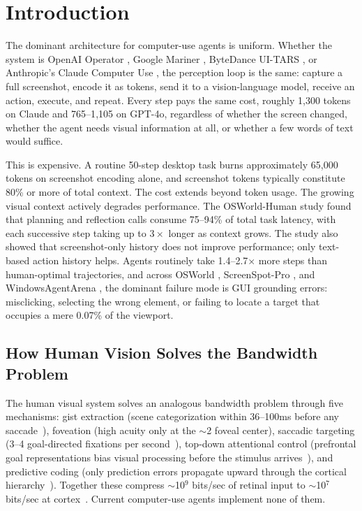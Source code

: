 \documentclass[11pt,a4paper]{article}
\begin{document}
\section{Introduction}
\label{sec:introduction}

The dominant architecture for computer-use agents is uniform.
Whether the system is OpenAI Operator \cite{openai-operator}, Google Mariner \cite{google-mariner}, ByteDance UI-TARS \cite{ui-tars,ui-tars-2}, or Anthropic's Claude Computer Use \cite{claude-computer-use}, the perception loop is the same: capture a full screenshot, encode it as tokens, send it to a vision-language model, receive an action, execute, and repeat.
Every step pays the same cost, roughly 1{,}300 tokens on Claude and 765--1{,}105 on GPT-4o, regardless of whether the screen changed, whether the agent needs visual information at all, or whether a few words of text would suffice.

This is expensive.
A routine 50-step desktop task burns approximately 65{,}000 tokens on screenshot encoding alone, and screenshot tokens typically constitute 80\% or more of total context.
The cost extends beyond token usage.
The growing visual context actively degrades performance.
The OSWorld-Human study \cite{osworld-human} found that planning and reflection calls consume 75--94\% of total task latency, with each successive step taking up to $3\times$ longer as context grows.
The study also showed that screenshot-only history does not improve performance; only text-based action history helps.
Agents routinely take 1.4--2.7$\times$ more steps than human-optimal trajectories, and across OSWorld \cite{osworld}, ScreenSpot-Pro \cite{screenspot-pro}, and WindowsAgentArena \cite{windowsagentarena}, the dominant failure mode is GUI grounding errors: misclicking, selecting the wrong element, or failing to locate a target that occupies a mere 0.07\% of the viewport.

\subsection{How Human Vision Solves the Bandwidth Problem}
\label{sec:intro-human-vision}

The human visual system solves an analogous bandwidth problem through five mechanisms: gist extraction (scene categorization within 36--100ms before any saccade~\cite{oliva-torralba-gist,thorpe1996speed}), foveation (high acuity only at the $\sim$2\textdegree{} foveal center), saccadic targeting (3--4 goal-directed fixations per second~\cite{land-hayhoe-saccades}), top-down attentional control (prefrontal goal representations bias visual processing before the stimulus arrives~\cite{desimone-duncan-attention,wolfe-guided-search}), and predictive coding (only prediction errors propagate upward through the cortical hierarchy~\cite{rao-ballard-1999}). Together these compress $\sim$10$^9$ bits/sec of retinal input to $\sim$10$^7$ bits/sec at cortex~\cite{koch2006retina}. Current computer-use agents implement none of them.
\end{document}
